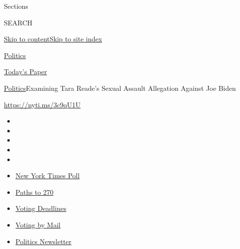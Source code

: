 Sections

SEARCH

\protect\hyperlink{site-content}{Skip to
content}\protect\hyperlink{site-index}{Skip to site index}

\href{https://www.nytimes3xbfgragh.onion/section/politics}{Politics}

\href{https://myaccount.nytimes3xbfgragh.onion/auth/login?response_type=cookie\&client_id=vi}{}

\href{https://www.nytimes3xbfgragh.onion/section/todayspaper}{Today's
Paper}

\href{/section/politics}{Politics}\textbar{}Examining Tara Reade's
Sexual Assault Allegation Against Joe Biden

\url{https://nyti.ms/3c9qU1U}

\begin{itemize}
\item
\item
\item
\item
\item
\end{itemize}

\begin{itemize}
\item
  \href{https://www.nytimes3xbfgragh.onion/2020/09/12/us/politics/biden-trump-poll-wisconsin-minnesota.html?action=click\&pgtype=Article\&state=default\&region=TOP_BANNER\&context=storylines_menu}{New
  York Times Poll}
\item
  \href{https://www.nytimes3xbfgragh.onion/interactive/2020/us/elections/election-states-biden-trump.html?action=click\&pgtype=Article\&state=default\&region=TOP_BANNER\&context=storylines_menu}{Paths
  to 270}
\item
  \href{https://www.nytimes3xbfgragh.onion/interactive/2019/us/elections/2020-presidential-election-calendar.html?action=click\&pgtype=Article\&state=default\&region=TOP_BANNER\&context=storylines_menu}{Voting
  Deadlines}
\item
  \href{https://www.nytimes3xbfgragh.onion/interactive/2020/08/31/us/politics/vote-by-mail-deadlines.html?action=click\&pgtype=Article\&state=default\&region=TOP_BANNER\&context=storylines_menu}{Voting
  by Mail}
\item
  \href{https://www.nytimes3xbfgragh.onion/newsletters/politics?action=click\&pgtype=Article\&state=default\&region=TOP_BANNER\&context=storylines_menu}{Politics
  Newsletter}
\end{itemize}

